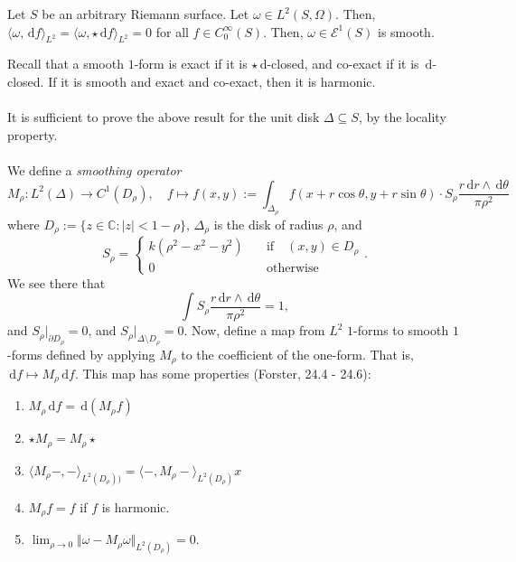 \documentclass[a4paper]{report}
\theoremstyle{definition}
\theoremstyle{remark}
\theoremstyle{proposition}
\theoremstyle{conjecture}
\theoremstyle{lemma}
\theoremstyle{corollary}
\theoremstyle{exercise}
\theoremstyle{example}
\newcommand{\C}{\mathbb{C}}
\newcommand{\mcal}{\mathcal}
\newcommand{\diff}{\,\mathrm{d}}
\begin{document}
\begin{theorem}\label{thm_weyls_lemma}
    Let $S$ be an arbitrary Riemann surface. Let $\omega \in L^2(S,\Omega)$.
    Then, $\langle\omega,\diff f\rangle_{L^2} =\langle\omega,\star\diff f\rangle_{L^2} = 0$ for all 
    $f \in C^\infty_0(S)$. Then, $\omega \in \mcal{E}^1(S)$ is smooth.
\end{theorem}
Recall that a smooth $1$-form is exact if it is $\star\diff$-closed,
and co-exact if it is $\diff$-closed. If it is smooth and exact and 
co-exact, then it is harmonic. \\\\
It is sufficient to prove the above result for the unit disk $\Delta\subseteq S$,
by the locality property.\\\\
We define a \emph{smoothing operator} 
$$M_\rho : L^2(\Delta) \longrightarrow C^1(D_\rho),\quad f\longmapsto f(x,y):=\int_{\Delta_\rho} f(x+r\cos\theta,y+r\sin\theta)\cdot S_\rho \frac{r \diff r \wedge \diff \theta}{\pi\rho^2}$$
where $D_\rho := \lbrace z \in \C : \vert z \vert < 1-\rho\rbrace$, 
$\Delta_\rho$ is the disk of radius $\rho$, and 
    $$S_\rho =\begin{cases} k(\rho^2-x^2-y^2) \quad &\text{if} \quad (x,y)\in D_\rho\\
    0 \quad &\text{otherwise}
\end{cases}.$$
We see there that $$\int S_\rho\frac{r\diff r\wedge\diff\theta}{\pi\rho^2}=1,$$
and $S_\rho \vert_{\partial D_\rho} = 0$, and $S_\rho \vert_{\Delta\setminus D_\rho}= 0$.
Now, define a map from $L^2$ $1$-forms to smooth $1$-forms 
defined by applying $M_\rho$ to the coefficient of the one-form.
That is, $\diff f \longmapsto M_\rho \diff f$. This map has some 
properties (Forster, 24.4 - 24.6):
\begin{enumerate}
    \item $M_\rho \diff f = \diff (M_\rho f)$
    \item $\star M_\rho = M_\rho\star$
\item $\langle M_\rho -,-\rangle_{L^2(D_\rho))} = \langle -,M_\rho-\rangle_{L^2(D_\rho)}x$
    \item $M_\rho f=  f$ if $f$ is harmonic.
    \item $\displaystyle\lim_{\rho\to0}\Vert \omega - M_\rho\omega\Vert_{L^2(D_\rho)} = 0.$
\end{enumerate}
\end{document}

